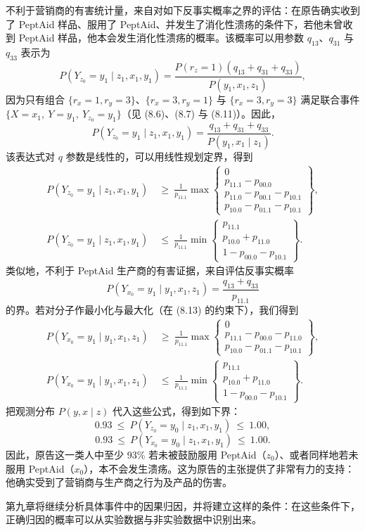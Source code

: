 不利于营销商的有害统计量，来自对如下反事实概率之界的评估：在原告确实收到了 PeptAid 样品、服用了 PeptAid、并发生了消化性溃疡的条件下，若他未曾收到 PeptAid 样品，他本会发生消化性溃疡的概率。该概率可以用参数 $q_{13}$、$q_{31}$ 与 $q_{33}$ 表示为
\[
P(Y_{z_0}=y_1\mid z_1,x_1,y_1)=\frac{P(r_z=1)(q_{13}+q_{31}+q_{33})}{P(y_1,x_1,z_1)},
\]
因为只有组合 $\{r_x=1,r_y=3\}$、$\{r_x=3,r_y=1\}$ 与 $\{r_x=3,r_y=3\}$ 满足联合事件 $\{X=x_1,\ Y=y_1,\ Y_{z_0}=y_1\}$（见 \textup{(8.6)}、\textup{(8.7)} 与 \textup{(8.11)}）。因此，
\[
P(Y_{z_0}=y_1\mid z_1,x_1,y_1)=\frac{q_{13}+q_{31}+q_{33}}{P(y_1,x_1\mid z_1)}.
\]
该表达式对 $q$ 参数是线性的，可以用线性规划定界，得到
\begin{equation*}
\begin{aligned}
P(Y_{z_0}=y_1\mid z_1,x_1,y_1)&\ \ge\ \frac{1}{p_{11.1}}\max\left\{
\begin{array}{l}
0\\
p_{11.1}-p_{00.0}\\
p_{11.0}-p_{00.1}-p_{10.1}\\
p_{10.0}-p_{01.1}-p_{10.1}
\end{array}\right\},\\
P(Y_{z_0}=y_1\mid z_1,x_1,y_1)&\ \le\ \frac{1}{p_{11.1}}\min\left\{
\begin{array}{l}
p_{11.1}\\
p_{10.0}+p_{11.0}\\
1-p_{00.0}-p_{10.1}
\end{array}\right\}.
\end{aligned}
\end{equation*}
类似地，不利于 PeptAid 生产商的有害证据，来自评估反事实概率
\[
P(Y_{x_0}=y_1\mid y_1,x_1,z_1)=\frac{q_{13}+q_{33}}{p_{11.1}}
\]
的界。若对分子作最小化与最大化（在 \textup{(8.13)} 的约束下），我们得到
\begin{equation*}
\begin{aligned}
P(Y_{x_0}=y_1\mid y_1,x_1,z_1)&\ \ge\ \frac{1}{p_{11.1}}\max\left\{
\begin{array}{l}
0\\
p_{11.1}-p_{00.0}-p_{11.0}\\
p_{10.0}-p_{01.1}-p_{10.1}
\end{array}\right\},\\
P(Y_{x_0}=y_1\mid y_1,x_1,z_1)&\ \le\ \frac{1}{p_{11.1}}\min\left\{
\begin{array}{l}
p_{11.1}\\
p_{10.0}+p_{11.0}\\
1-p_{00.0}-p_{10.1}
\end{array}\right\}.
\end{aligned}
\end{equation*}
把观测分布 $P(y,x\mid z)$ 代入这些公式，得到如下界：
\[
0.93\ \le\ P(Y_{z_0}=y_0\mid z_1,x_1,y_1)\ \le\ 1.00,
\]
\[
0.93\ \le\ P(Y_{x_0}=y_0\mid z_1,x_1,y_1)\ \le\ 1.00.
\]
因此，原告这一类人中至少 93\% 若未被鼓励服用 PeptAid（$z_0$）、或者同样地若未服用 PeptAid（$x_0$），本不会发生溃疡。这为原告的主张提供了非常有力的支持：他确实受到了营销商与生产商之行为及产品的伤害。

第九章将继续分析具体事件中的因果归因，并将建立这样的条件：在这些条件下，正确归因的概率可以从实验数据与非实验数据中识别出来。
